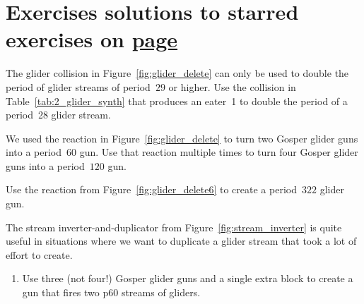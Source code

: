 \section*{Exercises \hfill \normalfont\textsf{\small solutions to starred exercises on \hyperlink{solutions_glider_guns}{page \pageref{solutions_glider_guns}}}}
\label{sec:guns_exercises}
\vspace*{-0.4cm}\hrulefill\vspace*{-0.3cm}\footnotesize\begin{multicols}{2}\vspace*{-0.4cm}\raggedcolumns{}
	\setlength{\parskip}{0pt}
	
	\begin{problemstar}\label{exer:p28_double} 
		The glider collision in Figure~\ref{fig:glider_delete} can only be used to double the period of glider streams of period~$29$ or higher. Use the collision in Table~\ref{tab:2_glider_synth} that produces an eater~1 to double the period of a period~28 glider stream.
	\end{problemstar}

	
	\mfilbreak
	
	
	\begin{problem}\label{exer:gun_double_again} 
		We used the reaction in Figure~\ref{fig:glider_delete} to turn two Gosper glider guns into a period~$60$ gun. Use that reaction multiple times to turn four Gosper glider guns into a period~$120$ gun.
	\end{problem}

	
	\mfilbreak
	
	
	\begin{problemstar}\label{exer:p322_gun} 
		Use the reaction from Figure~\ref{fig:glider_delete6} to create a period~$322$ glider gun.
	\end{problemstar}
	
	
	\mfilbreak
	
	
	\begin{problem}\label{exer:duplicate_doubled_stream}
		The stream inverter-and-duplicator from Figure~\ref{fig:stream_inverter} is quite useful in situations where we want to duplicate a glider stream that took a lot of effort to create.\smallskip
		
		\begin{enumerate}[label=\bf\color{ocre}(\alph*)]
			\item {} Use three (not four!) Gosper glider guns and a single extra block to create a gun that fires two p$60$ streams of gliders.
			

\end{enumerate}
\end{problem}
\end{multicols}
